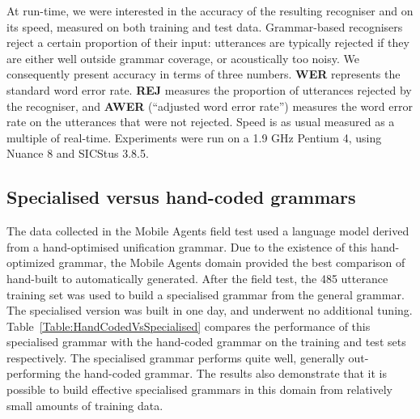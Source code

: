 \documentclass[11pt]{article}
\begin{document}
At run-time, we were interested in the accuracy of the resulting
recogniser and on its speed, measured on both training and test data.
Grammar-based recognisers reject a certain proportion of
their input: utterances are typically rejected if they are either well outside
grammar coverage, or acoustically too noisy.  We consequently present
accuracy in terms of three numbers.  {\bf WER} represents the standard
word error rate. {\bf REJ} measures the proportion of utterances
rejected by the recogniser, and {\bf AWER} (``adjusted word error
rate'') measures the word error rate on the utterances that were not
rejected. Speed is as usual measured as a multiple of
real-time. Experiments were run on a 1.9 GHz Pentium 4, using Nuance 8
and SICStus 3.8.5.

\subsection{Specialised versus hand-coded grammars}
\label{Section:GeneralVersusHandCoded}

%

The data collected in the Mobile Agents field test used a language
model derived from a hand-optimised unification grammar.  Due to the
existence of this hand-optimized grammar, the Mobile Agents domain
provided the best comparison of hand-built to automatically
generated. After the field test, the 485 utterance training set was
used to build a specialised grammar from the general grammar.  The
specialised version was built in one day, and underwent no additional
tuning. Table~\ref{Table:HandCodedVsSpecialised} compares the performance of this
specialised grammar with the hand-coded grammar on the training and
test sets respectively. The specialised grammar performs quite well,
generally out-performing the hand-coded grammar. The results also
demonstrate that it is possible to build effective specialised
grammars in this domain from relatively small amounts of training
data.
\end{document}
